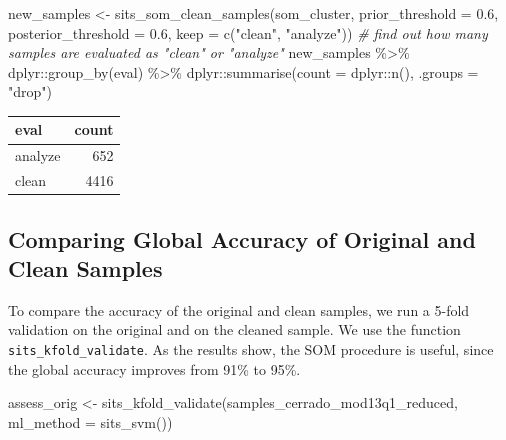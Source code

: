 \documentclass[a4paper,]{tufte-book}
\newenvironment{Shaded}{}{}
\newcommand{\AttributeTok}[1]{\textcolor[rgb]{0.49,0.56,0.16}{#1}}
\newcommand{\CommentTok}[1]{\textcolor[rgb]{0.38,0.63,0.69}{\textit{#1}}}
\newcommand{\FloatTok}[1]{\textcolor[rgb]{0.25,0.63,0.44}{#1}}
\newcommand{\FunctionTok}[1]{\textcolor[rgb]{0.02,0.16,0.49}{#1}}
\newcommand{\NormalTok}[1]{#1}
\newcommand{\OtherTok}[1]{\textcolor[rgb]{0.00,0.44,0.13}{#1}}
\newcommand{\SpecialCharTok}[1]{\textcolor[rgb]{0.25,0.44,0.63}{#1}}
\newcommand{\StringTok}[1]{\textcolor[rgb]{0.25,0.44,0.63}{#1}}
\begin{document}
\begin{Shaded}
\begin{Highlighting}[]
\NormalTok{new\_samples }\OtherTok{\textless{}{-}} \FunctionTok{sits\_som\_clean\_samples}\NormalTok{(som\_cluster, }
                                      \AttributeTok{prior\_threshold =} \FloatTok{0.6}\NormalTok{,}
                                      \AttributeTok{posterior\_threshold =} \FloatTok{0.6}\NormalTok{,}
                                      \AttributeTok{keep =} \FunctionTok{c}\NormalTok{(}\StringTok{"clean"}\NormalTok{, }\StringTok{"analyze"}\NormalTok{))}
\CommentTok{\# find out how many samples are evaluated as "clean" or "analyze"}
\NormalTok{new\_samples }\SpecialCharTok{\%\textgreater{}\%} 
\NormalTok{  dplyr}\SpecialCharTok{::}\FunctionTok{group\_by}\NormalTok{(eval) }\SpecialCharTok{\%\textgreater{}\%} 
\NormalTok{  dplyr}\SpecialCharTok{::}\FunctionTok{summarise}\NormalTok{(}\AttributeTok{count =}\NormalTok{ dplyr}\SpecialCharTok{::}\FunctionTok{n}\NormalTok{(), }\AttributeTok{.groups =} \StringTok{"drop"}\NormalTok{)}
\end{Highlighting}
\end{Shaded}

\begin{tabular}{l|r}
\hline
eval & count\\
\hline
analyze & 652\\
\hline
clean & 4416\\
\hline
\end{tabular}

\hypertarget{comparing-global-accuracy-of-original-and-clean-samples}{%
\subsection{Comparing Global Accuracy of Original and Clean Samples}\label{comparing-global-accuracy-of-original-and-clean-samples}}

To compare the accuracy of the original and clean samples, we run
a 5-fold validation on the original and on the cleaned sample. We use the function
\texttt{sits\_kfold\_validate}. As the results show, the SOM procedure is useful, since
the global accuracy improves from 91\% to 95\%.

\begin{Shaded}
\begin{Highlighting}[]
\NormalTok{assess\_orig }\OtherTok{\textless{}{-}} \FunctionTok{sits\_kfold\_validate}\NormalTok{(samples\_cerrado\_mod13q1\_reduced, }
                                   \AttributeTok{ml\_method =} \FunctionTok{sits\_svm}\NormalTok{())}
\end{Highlighting}
\end{Shaded}
\end{document}
